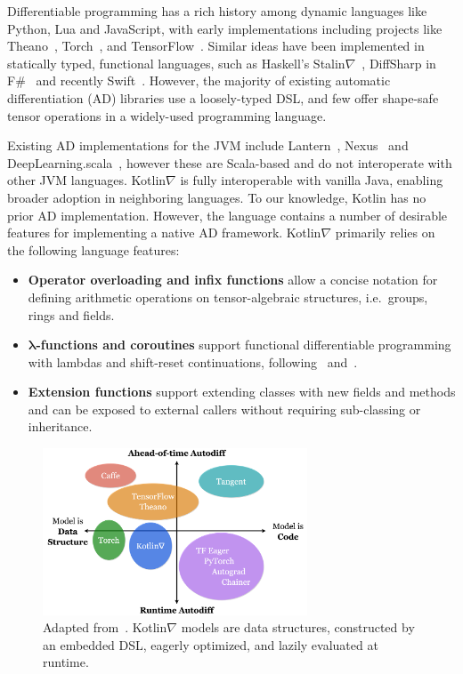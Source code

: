 \documentclass[12pt,initial,twoside,maitrise]{dms}
\numberwithin{equation}{section}
\numberwithin{table}{chapter}
\numberwithin{figure}{chapter}
\begin{document}
Differentiable programming has a rich history among dynamic languages like Python, Lua and JavaScript, with early implementations including projects like Theano~\citep{theano}, Torch~\citep{collobert2002torch}, and TensorFlow~\citep{abadi2016tensorflow}. Similar ideas have been implemented in statically typed, functional languages, such as Haskell's Stalin$\nabla$~\citep{pearlmutter2008using}, DiffSharp in F\#~\citep{baydin-diffsharp} and recently Swift~\citep{swift}. However, the majority of existing automatic differentiation (AD) libraries use a loosely-typed DSL, and few offer shape-safe tensor operations in a widely-used programming language.

Existing AD implementations for the JVM include Lantern~\citep{DBLP:journals-corr-abs-1803-10228}, Nexus~\citep{chen2017typesafe} and DeepLearning.scala~\citep{dl4s}, however these are Scala-based and do not interoperate with other JVM languages. Kotlin$\nabla$ is fully interoperable with vanilla Java, enabling broader adoption in neighboring languages. To our knowledge, Kotlin has no prior AD implementation. However, the language contains a number of desirable features for implementing a native AD framework. Kotlin$\nabla$ primarily relies on the following language features:

\begin{itemize}
\item \textbf{Operator overloading and infix functions} allow a concise notation for defining arithmetic operations on tensor-algebraic structures, i.e.\ groups, rings and fields.
\item \textbf{$\mathbf{\lambda}$-functions and coroutines} support functional differentiable programming with lambdas and shift-reset continuations, following~\citet{pearlmutter2008reverse} and~\citet{DBLP:journals-corr-abs-1803-10228}.
\item \textbf{Extension functions} support extending classes with new fields and methods and can be exposed to external callers without requiring sub-classing or inheritance.
\end{itemize}

\begin{figure}
    \centering
    \includegraphics[width=0.70\textwidth]{kotlingrad_diagram.png}
    \caption{Adapted from~\citet{van2018tangent}. Kotlin$\nabla$ models are data structures, constructed by an embedded DSL, eagerly optimized, and lazily evaluated at runtime.}
    \label{fig:kotlingrad_digram}
\end{figure}
\end{document}
